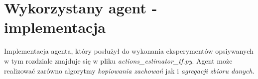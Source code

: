\section{Wykorzystany agent - implementacja}

Implementacja agenta, który posłużył do wykonania eksperymentów opsiywanych w tym rozdziale znajduje się w pliku \textit{actions\_estimator\_tf.py}. Agent może realizować zarówno algorytmy \textit{kopiowania zachowań} jak i \textit{agregacji zbioru danych}.


